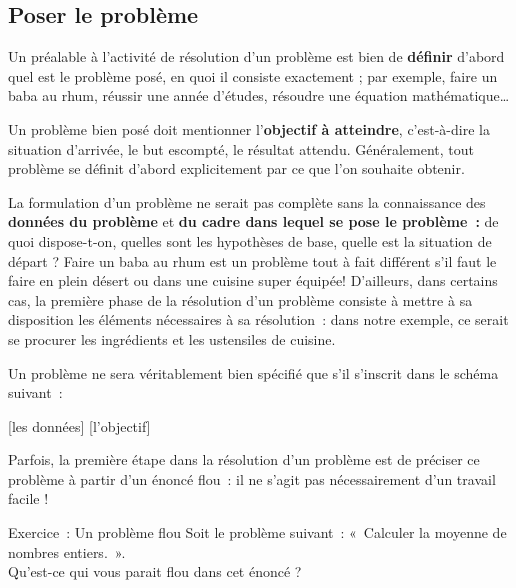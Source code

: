 	\subsection{Poser le problème}
	
		Un préalable à l’activité de résolution d’un problème est bien de
		\textbf{définir} d’abord quel est le problème posé, en quoi il consiste
		exactement ; par exemple, faire un baba au rhum, réussir une année
		d’études, résoudre une équation mathématique\dots
		
		Un problème bien posé doit mentionner l’\textbf{objectif à atteindre},
		c’est-à-dire la situation d’arrivée, le but escompté, le résultat
		attendu. Généralement, tout problème se définit d’abord explicitement
		par ce que l’on souhaite obtenir.
		
		La formulation d’un problème ne serait pas complète sans la connaissance
		des \textbf{données du problème} et \textbf{du cadre dans lequel se
		pose le problème~:} de quoi dispose-t-on, quelles sont les hypothèses
		de base, quelle est la situation de départ ? Faire un baba au rhum est
		un problème tout à fait différent s’il faut le faire en plein désert ou
		dans une cuisine super équipée! D’ailleurs, dans certains cas, la
		première phase de la résolution d’un problème consiste à mettre à sa
		disposition les éléments nécessaires à sa résolution~: dans notre
		exemple, ce serait se procurer les ingrédients et les ustensiles de
		cuisine.
	
		Un problème ne sera véritablement bien spécifié que s’il s’inscrit dans
		le schéma suivant~:
		
		\begin{center}
		\begin{Ovalbox}
		{ [les données]  [l’objectif]}
		\end{Ovalbox}
		\end{center}
	
		Parfois, la première étape dans la résolution d’un problème est de
		préciser ce problème à partir d’un énoncé flou~: il ne s’agit pas
		nécessairement d’un travail facile !

		\begin{Emphase}[exercice]{Exercice~: Un problème flou}
			Soit le problème suivant~: «~Calculer la moyenne de nombres entiers.~».
			\\Qu'est-ce qui vous parait flou dans cet énoncé ?
		\end{Emphase}

